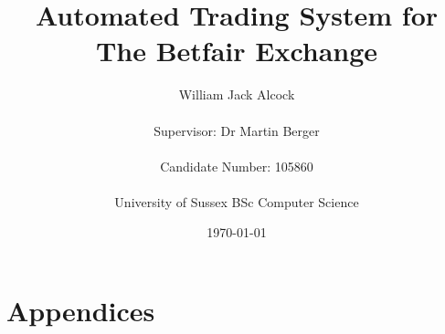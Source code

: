 \documentclass[11pt]{report}
\begin{document}
\title{Automated Trading System for The Betfair Exchange}
\author{William Jack Alcock\\\\Supervisor: Dr Martin Berger\\\\Candidate Number: 105860\\\\University of Sussex BSc Computer Science}
\date{\today}

\maketitle







\tableofcontents
\listoffigures
\listoftables


	







	


\chapter{Appendices}

\printbibliography[heading=bibintoc]
\end{document}
